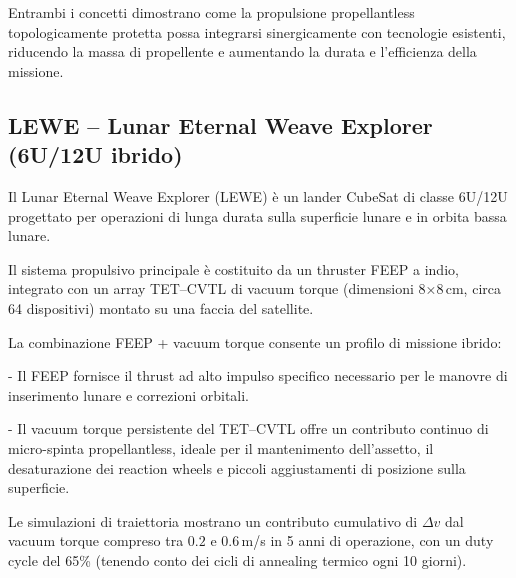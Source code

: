 \documentclass[11pt,a4paper]{article}
\theoremstyle{plain}
\theoremstyle{definition}
\begin{document}
Entrambi i concetti dimostrano come la propulsione propellantless topologicamente protetta possa integrarsi sinergicamente con tecnologie esistenti, riducendo la massa di propellente e aumentando la durata e l’efficienza della missione.



\vspace{0.4cm}


\subsection{LEWE – Lunar Eternal Weave Explorer (6U/12U ibrido)}

\vspace{0.2cm}

Il Lunar Eternal Weave Explorer (LEWE) è un lander CubeSat di classe 6U/12U progettato per operazioni di lunga durata sulla superficie lunare e in orbita bassa lunare. 

\vspace{0.2cm}

Il sistema propulsivo principale è costituito da un thruster FEEP a indio, integrato con un array TET--CVTL di vacuum torque (dimensioni 8×8\,cm, circa 64 dispositivi) montato su una faccia del satellite.



\vspace{0.2cm}

La combinazione FEEP + vacuum torque consente un profilo di missione ibrido:

\vspace{0.1cm}

- Il FEEP fornisce il thrust ad alto impulso specifico necessario per le manovre di inserimento lunare e correzioni orbitali.


\vspace{0.1cm}

- Il vacuum torque persistente del TET--CVTL offre un contributo continuo di micro-spinta propellantless, ideale per il mantenimento dell’assetto, il desaturazione dei reaction wheels e piccoli aggiustamenti di posizione sulla superficie.

\vspace{0.2cm}

Le simulazioni di traiettoria mostrano un contributo cumulativo di $\Delta v$ dal vacuum torque compreso tra $0.2$ e $0.6$\,m/s in 5 anni di operazione, con un duty cycle del 65\% (tenendo conto dei cicli di annealing termico ogni 10 giorni). 
\end{document}
